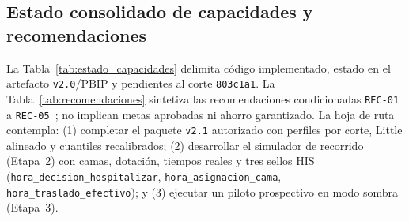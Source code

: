 \subsection{Estado consolidado de capacidades y recomendaciones}

La Tabla~\ref{tab:estado_capacidades} delimita código implementado, estado en el artefacto \texttt{v2.0}/PBIP y pendientes al corte \texttt{803c1a1}. La Tabla~\ref{tab:recomendaciones} sintetiza las recomendaciones condicionadas \texttt{REC-01} a \texttt{REC-05}~\cite{mediflow2026optimizacion,mediflow2026informe}; no implican metas aprobadas ni ahorro garantizado. La hoja de ruta contempla: (1) completar el paquete \texttt{v2.1} autorizado con perfiles por corte, Little alineado y cuantiles recalibrados; (2) desarrollar el simulador de recorrido (Etapa~2) con camas, dotación, tiempos reales y tres sellos HIS (\texttt{hora\_\allowbreak decision\_\allowbreak hospitalizar}, \texttt{hora\_\allowbreak asignacion\_\allowbreak cama}, \texttt{hora\_\allowbreak traslado\_\allowbreak efectivo}); y (3) ejecutar un piloto prospectivo en modo sombra (Etapa~3).


